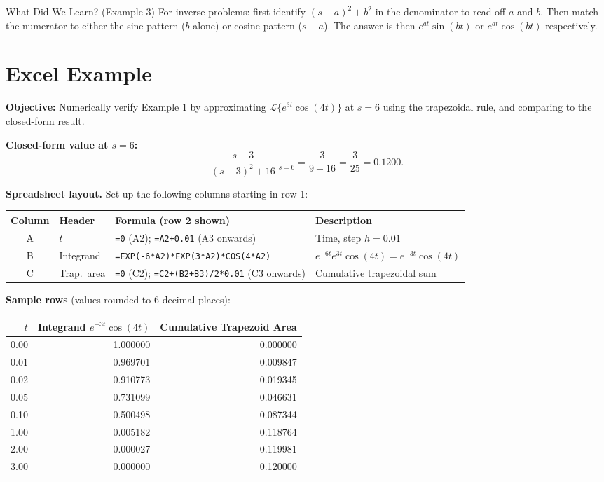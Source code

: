 \documentclass[12pt,a4paper]{article}
\begin{document}
\begin{learnbox}{What Did We Learn? (Example 3)}
For inverse problems: first identify $(s-a)^2 + b^2$ in the denominator to read off $a$ and $b$.
Then match the numerator to either the sine pattern ($b$ alone) or cosine pattern ($s-a$).
The answer is then $e^{at}\sin(bt)$ or $e^{at}\cos(bt)$ respectively.
\end{learnbox}

\section{Excel Example}

\textbf{Objective:}
Numerically verify Example 1 by approximating $\mathcal{L}\{e^{3t}\cos(4t)\}$ at $s = 6$
using the trapezoidal rule, and comparing to the closed-form result.

\textbf{Closed-form value at $s=6$:}
\[
  \frac{s-3}{(s-3)^2+16}\Bigg|_{s=6}
  = \frac{3}{9+16} = \frac{3}{25} = 0.1200.
\]

\textbf{Spreadsheet layout.}
Set up the following columns starting in row 1:

\begin{center}
\begin{tabular}{@{}clll@{}}
\toprule
\textbf{Column} & \textbf{Header} & \textbf{Formula (row 2 shown)} & \textbf{Description} \\
\midrule
A & $t$ & \texttt{=0} (A2); \texttt{=A2+0.01} (A3 onwards) & Time, step $h = 0.01$ \\
B & Integrand & \texttt{=EXP(-6*A2)*EXP(3*A2)*COS(4*A2)} & $e^{-6t}e^{3t}\cos(4t) = e^{-3t}\cos(4t)$ \\
C & Trap.\ area & \texttt{=0} (C2); \texttt{=C2+(B2+B3)/2*0.01} (C3 onwards) & Cumulative trapezoidal sum \\
\bottomrule
\end{tabular}
\end{center}

\textbf{Sample rows} (values rounded to 6 decimal places):

\begin{center}
\begin{tabular}{@{}rrr@{}}
\toprule
$t$ & Integrand $e^{-3t}\cos(4t)$ & Cumulative Trapezoid Area \\
\midrule
0.00 & 1.000000 & 0.000000 \\
0.01 & 0.969701 & 0.009847 \\
0.02 & 0.910773 & 0.019345 \\
0.05 & 0.731099 & 0.046631 \\
0.10 & 0.500498 & 0.087344 \\
1.00 & 0.005182 & 0.118764 \\
2.00 & 0.000027 & 0.119981 \\
3.00 & 0.000000 & 0.120000 \\
\bottomrule
\end{tabular}
\end{center}
\end{document}
